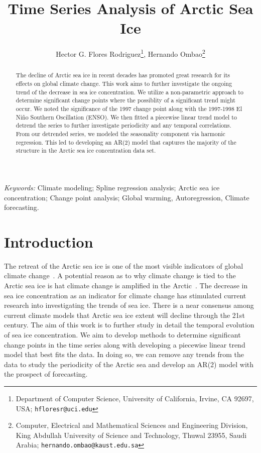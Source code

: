\documentclass[12pt]{article}
\begin{document}
\date{}
\def\spacingset#1{\renewcommand{\baselinestretch}%
{#1}\small\normalsize} \spacingset{1}


\title{\bf Time Series Analysis of Arctic Sea Ice}
\author{Hector G. Flores Rodriguez\footnote{Department of Computer Science, University of California, Irvine, CA 92697, USA; \texttt{hfloresr@uci.edu}}, Hernando Ombao\footnote{Computer, Electrical and Mathematical Sciences and Engineering Division, King Abdullah University of Science and Technology, Thuwal 23955, Saudi Arabia; \texttt{hernando.ombao@kaust.edu.sa}}}
\maketitle


\bigskip
\begin{abstract}
The decline of Arctic sea ice in recent decades has promoted great research for its effects on global climate change. This work aims to further investigate the ongoing trend of the decrease in sea ice concentration. We utilize a non-parametric approach to determine significant change points where the possiblity of a significant trend might occur. We noted the significance of the 1997 change point along with the 1997-1998 El Niño Southern Oscillation (ENSO). We then fitted a piecewise linear trend model to detrend the series to further investigate periodicity and any temporal correlations. From our detrended series, we modeled the seasonality component via harmonic regression. This led to developing an AR(2) model that captures the majority of the structure in the Arctic sea ice concentration data set.
\end{abstract}

\noindent%
{\it Keywords:}  Climate modeling; Spline regression analysis; Arctic sea ice concentration; Change point analysis; Global warming, Autoregression, Climate forecasting.
\vfill


\newpage
\spacingset{2} %
\section{Introduction}
The retreat of the Arctic sea ice is one of the most visible indicators of global climate change~\citep{zhang}. A potential reason as to why climate change is tied to the Arctic sea ice is hat climate change is amplified in the Arctic~\citep{pithan}. The decrease in sea ice concentration as an indicator for climate change has stimulated current research into investigating the trends of sea ice. There is a near consensus among current climate models that Arctic sea ice extent will decline through the 21st century. The aim of this work is to further study in detail the temporal evolution of sea ice concentration. We aim to develop methods to determine significant change points in the time series along with developing a piecewise linear trend model that best fits the data. In doing so, we can remove any trends from the data to study the periodicity of the Arctic sea and develop an AR(2) model with the prospect of forecasting.
\end{document}
